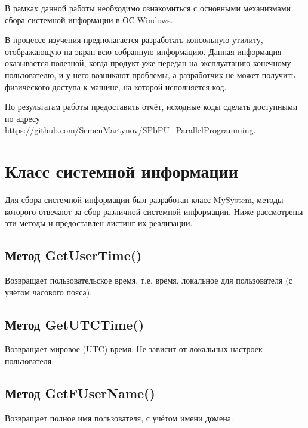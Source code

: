 \documentclass[a4paper, 12pt]{report}		%
\begin{document}
\vspace{1em}

В рамках данной работы необходимо ознакомиться с основными механизмами сбора системной информации в ОС Windows.
\vspace{1em}

В процессе изучения предполагается разработать консольную утилиту, отображающую на экран всю собранную информацию. Данная информация оказывается полезной, когда продукт уже передан на эксплуатацию конечному пользователю, и у него возникают проблемы, а разработчик не может получить физического доступа к машине, на которой исполняется код.
\vspace{1em}

По результатам работы предоставить отчёт, исходные коды сделать доступными по адресу \\ \url{https://github.com/SemenMartynov/SPbPU_ParallelProgramming}. 

\chapter*{Класс системной информации}

\vspace{1em}

Для сбора системной информации был разработан класс MySystem, методы которого отвечают за сбор различной системной информации. Ниже рассмотрены эти методы и предоставлен листинг их реализации.

\section*{Метод GetUserTime()}
Возвращает пользовательское время, т.е. время, локальное для пользователя (с учётом часового пояса).

\section*{Метод GetUTCTime()}
Возвращает мировое (UTC) время. Не зависит от локальных настроек пользователя.

\section*{Метод GetFUserName()}
Возвращает полное имя пользователя, с учётом имени домена.
\end{document}
